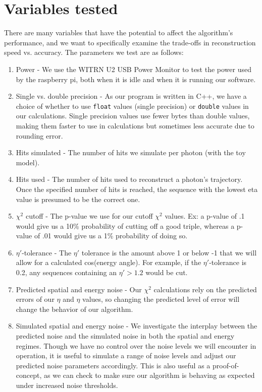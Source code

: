 \section{Variables tested}
There are many variables that have the potential to affect the algorithm's performance, and we want to specifically examine the trade-offs in reconstruction speed vs. accuracy. The parameters we test are as follows:

\begin{enumerate}
    \item Power - We use the WITRN U2 USB Power Monitor to test the power used by the raspberry pi, both when it is idle and when it is running our software.
    \item Single vs. double precision - As our program is written in C++, we have a choice of whether to use \texttt{float} values (single precision) or \texttt{double} values in our calculations. Single precision values use fewer bytes than double values, making them faster to use in calculations but sometimes less accurate due to rounding error.
    \item Hits simulated - The number of hits we simulate per photon (with the toy model).
    \item Hits used - The number of hits used to reconstruct a photon's trajectory. Once the specified number of hits is reached, the sequence with the lowest eta value is presumed to be the correct one.
    \item $\chi^2$ cutoff - The p-value we use for our cutoff $\chi^2$ values. Ex: a p-value of .1 would give us a 10\% probability of cutting off a good triple, whereas a p-value of .01 would give us a 1\% probability of doing so.
    \item $\eta'$-tolerance - The $\eta'$ tolerance is the amount above 1 or below -1 that we will allow for a calculated cos(energy angle). For example, if the $\eta'$-tolerance is 0.2, any sequences containing an $\eta' > 1.2$ would be cut.
    \item Predicted spatial and energy noise - Our $\chi^2$ calculations rely on the predicted errors of our $\eta$ and $\eta$ values, so changing the predicted level of error will change the behavior of our algorithm.
    \item Simulated spatial and energy noise - We investigate the interplay between the predicted noise and the simulated noise in both the spatial and energy regimes. Though we have no control over the noise levels we will encounter in operation, it is useful to simulate a range of noise levels and adjust our predicted noise parameters accordingly. This is also useful as a proof-of-concept, as we can check to make sure our algorithm is behaving as expected under increased noise thresholds.
\end{enumerate}